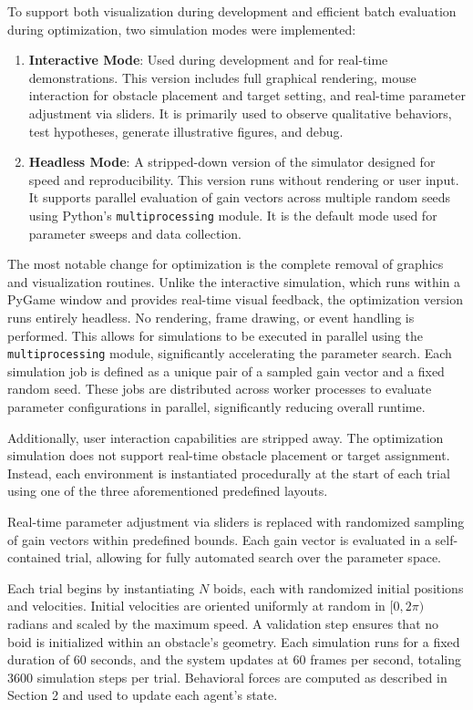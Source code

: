 \documentclass[12pt]{article}
\begin{document}
To support both visualization during development and efficient batch evaluation during optimization, two simulation modes were implemented:
\begin{enumerate}[nosep]
    \item \textbf{Interactive Mode}: Used during development and for real-time demonstrations. This version includes full graphical rendering, mouse interaction for obstacle placement and target setting, and real-time parameter adjustment via sliders. It is primarily used to observe qualitative behaviors, test hypotheses, generate illustrative figures, and debug.
    \item \textbf{Headless Mode}: A stripped-down version of the simulator designed for speed and reproducibility. This version runs without rendering or user input. It supports parallel evaluation of gain vectors across multiple random seeds using Python's \texttt{multiprocessing} module. It is the default mode used for parameter sweeps and data collection.
\end{enumerate}

The most notable change for optimization is the complete removal of graphics and visualization routines. Unlike the interactive simulation, which runs within a PyGame window and provides real-time visual feedback, the optimization version runs entirely headless. No rendering, frame drawing, or event handling is performed. This allows for simulations to be executed in parallel using the \texttt{multiprocessing} module, significantly accelerating the parameter search. Each simulation job is defined as a unique pair of a sampled gain vector and a fixed random seed. These jobs are distributed across worker processes to evaluate parameter configurations in parallel, significantly reducing overall runtime.

Additionally, user interaction capabilities are stripped away. The optimization simulation does not support real-time obstacle placement or target assignment. Instead, each environment is instantiated procedurally at the start of each trial using one of the three aforementioned predefined layouts.

Real-time parameter adjustment via sliders is replaced with randomized sampling of gain vectors within predefined bounds. Each gain vector is evaluated in a self-contained trial, allowing for fully automated search over the parameter space.

Each trial begins by instantiating \(N\) boids, each with randomized initial positions and velocities. Initial velocities are oriented uniformly at random in \([0, 2\pi)\) radians and scaled by the maximum speed. A validation step ensures that no boid is initialized within an obstacle's geometry. Each simulation runs for a fixed duration of 60 seconds, and the system updates at 60 frames per second, totaling 3600 simulation steps per trial. Behavioral forces are computed as described in Section 2 and used to update each agent’s state.
\end{document}
